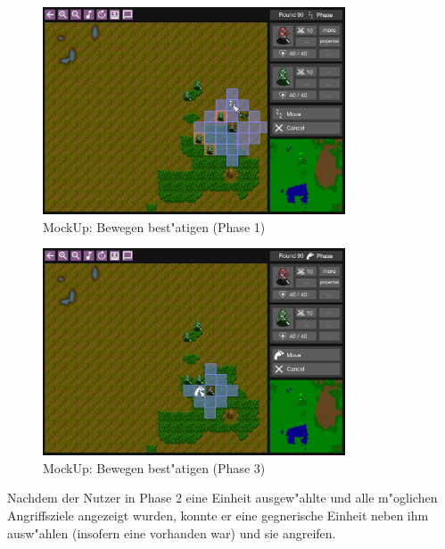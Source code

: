 \documentclass[12pt, titlepage]{scrartcl}
\newcounter{subsubsubsection}[subsubsection]
\begin{document}
                    \begin{figure}[H] 
                    	\centering
                    	\includegraphics[width=0.8\textwidth]{images/mockUps/ConfirmMove.png}
                    	\caption{MockUp: Bewegen best"atigen (Phase 1)}
                    	\label{Move}
                    \end{figure}
	                \begin{figure}[H] 
	                	\centering
	                	\includegraphics[width=0.8\textwidth]{images/mockUps/ConfirmMove2.png}
	                	\caption{MockUp: Bewegen best"atigen (Phase 3)}
	                	\label{Move2}
	                \end{figure}
			        Nachdem der Nutzer in Phase 2 eine Einheit ausgew"ahlte und alle m"oglichen Angriffsziele angezeigt wurden, konnte er eine gegnerische Einheit neben ihm ausw"ahlen (insofern eine vorhanden war) und sie angreifen. \\
\end{document}
